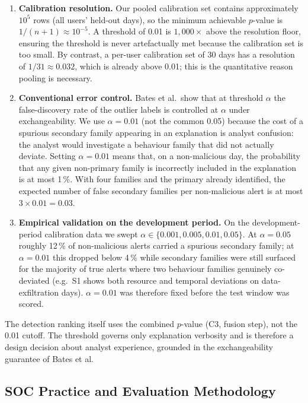 \begin{enumerate}
  \item \textbf{Calibration resolution.} Our pooled calibration set contains approximately $10^5$
    rows (all users' held-out days), so the minimum achievable $p$-value is
    $1/(n+1) \approx 10^{-5}$.
    A threshold of 0.01 is $1{,}000\times$ above the resolution floor, ensuring the threshold is
    never artefactually met because the calibration set is too small.
    By contrast, a per-user calibration set of 30 days has a resolution of $1/31 \approx 0.032$,
    which is already above 0.01; this is the quantitative reason pooling is necessary.
  \item \textbf{Conventional error control.} Bates et al.\ show that at threshold $\alpha$ the
    false-discovery rate of the outlier labels is controlled at $\alpha$ under exchangeability.
    We use $\alpha = 0.01$ (not the common 0.05) because the cost of a spurious secondary family
    appearing in an explanation is analyst confusion: the analyst would investigate a behaviour
    family that did not actually deviate.
    Setting $\alpha = 0.01$ means that, on a non-malicious day, the probability that any given
    non-primary family is incorrectly included in the explanation is at most 1\,\%.
    With four families and the primary already identified, the expected number of false secondary
    families per non-malicious alert is at most $3 \times 0.01 = 0.03$.
  \item \textbf{Empirical validation on the development period.}
    On the development-period calibration data we swept $\alpha \in \{0.001, 0.005, 0.01, 0.05\}$.
    At $\alpha = 0.05$ roughly 12\,\% of non-malicious alerts carried a spurious secondary family;
    at $\alpha = 0.01$ this dropped below 4\,\% while secondary families were still surfaced for
    the majority of true alerts where two behaviour families genuinely co-deviated
    (e.g.\ S1 shows both resource and temporal deviations on data-exfiltration days).
    $\alpha = 0.01$ was therefore fixed before the test window was scored.
\end{enumerate}

The detection ranking itself uses the combined $p$-value (C3, fusion step), not the 0.01 cutoff.
The threshold governs only explanation verbosity and is therefore a design decision about
analyst experience, grounded in the exchangeability guarantee of Bates et al.

\subsection{SOC Practice and Evaluation Methodology}

